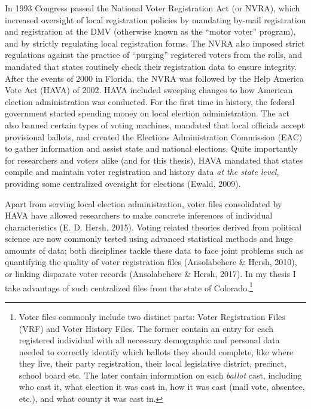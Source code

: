 \documentclass[12pt,twoside]{reedthesis}
\begin{document}
  In 1993 Congress passed the National Voter Registration Act (or NVRA),
  which increased oversight of local registration policies by mandating
  by-mail registration and registration at the DMV (otherwise known as the
  ``motor voter'' program), and by strictly regulating local registration
  forms. The NVRA also imposed strict regulations against the practice of
  ``purging'' registered voters from the rolls, and mandated that states
  routinely check their registration data to ensure integrity. After the
  events of 2000 in Florida, the NVRA was followed by the Help America
  Vote Act (HAVA) of 2002. HAVA included sweeping changes to how American
  election administration was conducted. For the first time in history,
  the federal government started spending money on local election
  administration. The act also banned certain types of voting machines,
  mandated that local officials accept provisional ballots, and created
  the Elections Administration Commission (EAC) to gather information and
  assist state and national elections. Quite importantly for researchers
  and voters alike (and for this thesis), HAVA mandated that states
  compile and maintain voter registration and history data \emph{at the
  state level}, providing some centralized oversight for elections (Ewald,
  2009).
  
  Apart from serving local election administration, voter files
  consolidated by HAVA have allowed researchers to make concrete
  inferences of individual characteristics (E. D. Hersh, 2015). Voting
  related theories derived from political science are now commonly tested
  using advanced statistical methods and huge amounts of data; both
  disciplines tackle these data to face joint problems such as quantifying
  the quality of voter registration files (Ansolabehere \& Hersh, 2010),
  or linking disparate voter records (Ansolabehere \& Hersh, 2017). In my
  thesis I take advantage of such centralized files from the state of
  Colorado.\footnote{Voter files commonly include two distinct parts:
    Voter Registration Files (VRF) and Voter History Files. The former
    contain an entry for each registered individual with all necessary
    demographic and personal data needed to correctly identify which
    ballots they should complete, like where they live, their party
    registration, their local legislative district, precinct, school board
    etc. The later contain information on each \emph{ballot} cast,
    including who cast it, what election it was cast in, how it was cast
    (mail vote, absentee, etc.), and what county it was cast in.}
  
\end{document}
